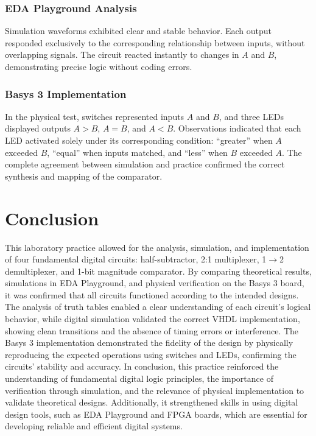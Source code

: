\documentclass[12pt]{article}  %
\begin{document}
\subsubsection{EDA Playground Analysis}
Simulation waveforms exhibited clear and stable behavior.
Each output responded exclusively to the corresponding relationship between
inputs, without overlapping signals. The circuit reacted instantly to changes
in $A$ and $B$, demonstrating precise logic without coding errors.

\subsubsection{Basys 3 Implementation}
In the physical test, switches represented inputs $A$ and $B$,
and three LEDs displayed outputs $A > B$, $A = B$, and $A < B$. Observations
indicated that each LED activated solely under its corresponding condition:
“greater” when $A$ exceeded $B$, “equal” when inputs matched, and “less” when $B$
exceeded $A$. The complete agreement between simulation and practice confirmed
the correct synthesis and mapping of the comparator.

\section{Conclusion}
This laboratory practice allowed for the analysis, simulation, and implementation of four fundamental digital circuits: half-subtractor, 2:1 multiplexer, 1$\to$2 demultiplexer, and 1-bit magnitude comparator. By comparing theoretical results, simulations in EDA Playground, and physical verification on the Basys 3 board, it was confirmed that all circuits functioned according to the intended designs.
The analysis of truth tables enabled a clear understanding of each circuit's logical behavior, while digital simulation validated the correct VHDL implementation, showing clean transitions and the absence of timing errors or interference. The Basys 3 implementation demonstrated the fidelity of the design by physically reproducing the expected operations using switches and LEDs, confirming the circuits’ stability and accuracy.
In conclusion, this practice reinforced the understanding of fundamental digital logic principles, the importance of verification through simulation, and the relevance of physical implementation to validate theoretical designs. Additionally, it strengthened skills in using digital design tools, such as EDA Playground and FPGA boards, which are essential for developing reliable and efficient digital systems.
\clearpage %
\end{document}
